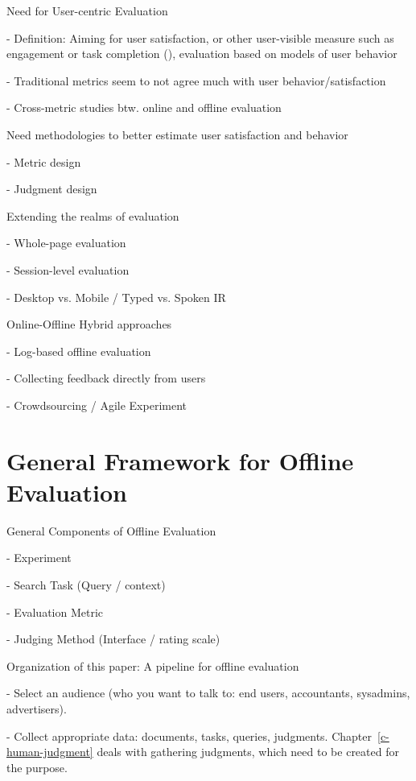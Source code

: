 \documentclass[openany]{now} %
\newcommand{\newpar}{\bigskip\noindent}
\begin{document}
Need for User-centric Evaluation

- Definition: Aiming for user satisfaction, or other user-visible measure such as engagement or task completion (\cite{scholer13}), evaluation based on models of user behavior

- Traditional metrics seem to not agree much with user behavior/satisfaction
 \cite{Al-Maskari2007} 

- Cross-metric studies btw. online and offline evaluation \cite{radl:comp10}

\newpar
Need methodologies to better estimate user satisfaction and behavior

-	Metric design \cite{YilmazSCR10, CarteretteKY11, ChapelleMZG09}

-	Judgment design \cite{VermaY16, VermaYC16}

\newpar
Extending the realms of evaluation

-	Whole-page evaluation \cite{Zhou:2012}

-	Session-level evaluation \cite{KanoulasCCS11, CarteretteKHC14}

-	Desktop vs. Mobile / Typed vs. Spoken IR \cite{VermaYC16}

\newpar
Online-Offline Hybrid approaches

- Log-based offline evaluation \cite{Li:2015} \cite{li2010contextual}

- Collecting feedback directly from users \cite{Kim2016}

- Crowdsourcing / Agile Experiment

\section{General Framework for Offline Evaluation}

General Components of Offline Evaluation

-	Experiment

-	Search Task (Query / context)

-	Evaluation Metric

-	Judging Method (Interface / rating scale) 

\newpar
Organization of this paper: A pipeline for offline evaluation

- Select an audience (who you want to talk to: end users, accountants, sysadmins, advertisers). 

- Collect appropriate data: documents, tasks, queries, judgments.  Chapter~\ref{c-human-judgment} deals with gathering judgments, which need to be created for the purpose.
\end{document}
